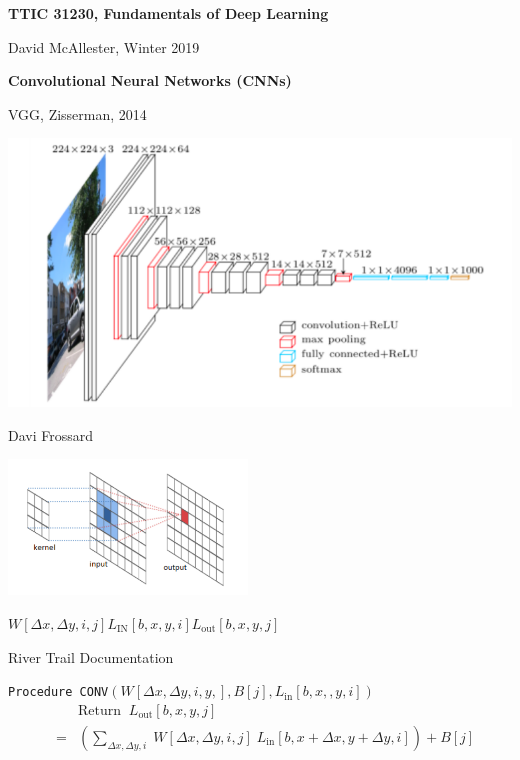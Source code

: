 




{\Huge

  \centerline{\bf TTIC 31230, Fundamentals of Deep Learning}
  \bigskip
  \centerline{David McAllester, Winter 2019}

    \vfill
  \centerline{\bf Convolutional Neural Networks (CNNs)}
  \vfill
  \vfill


{VGG, Zisserman, 2014}

\centerline{\includegraphics[width = 8.0in]{../images/VGG}}
\centerline{\large Davi Frossard}


\centerline{\includegraphics[width = 2.5in]{../images/Convolution}}
\centerline{$W[\Delta x,\Delta y,i,j]$\hspace{6ex}$L_{\mathrm{IN}}[b,x,y,i]$\hspace{6ex}$L_{\mathrm{out}}[b,x,y,j]$}
\centerline{\large River Trail Documentation}

\vfill
{\tt Procedure CONV}$(W[\Delta x, \Delta y, i, y,], B[j], L_{\mathrm{in}}[b,x,,y,i])$
\begin{eqnarray*}
 & &  \mbox{Return}\;\;L_{\mathrm{out}}[b,x,y,j] \\
 & = &   \left(\sum_{\Delta x, \Delta y, i}\;W[\Delta x, \Delta y, i,j]\; L_{\mathrm{in}}[b,x + \Delta x, y + \Delta y, i]\right) + B[j]
\end{eqnarray*}

}
